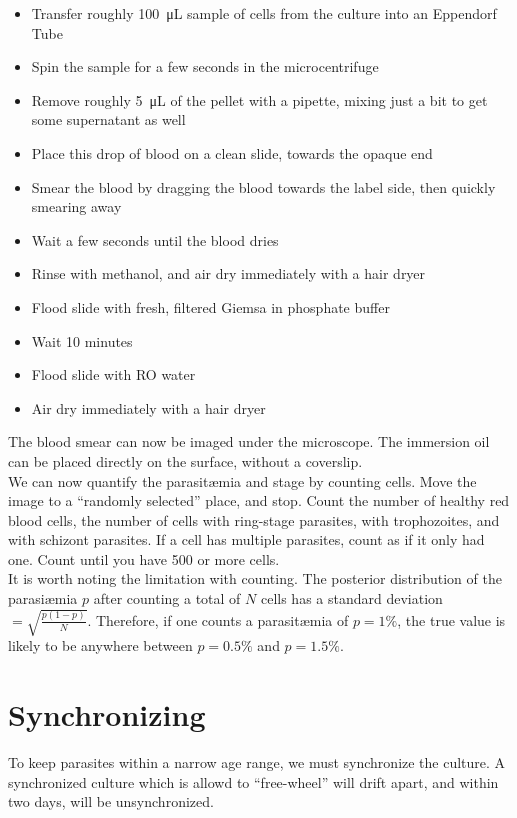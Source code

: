 \documentclass{article}
\begin{document}
\begin{itemize}
	\item Transfer roughly \SI{100}{\micro L} sample of cells from the culture into an Eppendorf Tube
	\item Spin the sample for a few seconds in the microcentrifuge
	\item Remove roughly \SI{5}{\micro L} of the pellet with a pipette, mixing just a bit to get some supernatant as well
	\item Place this drop of blood on a clean slide, towards the opaque end
	\item Smear the blood by dragging the blood towards the label side, then quickly smearing away 
	\item Wait a few seconds until the blood dries
	\item Rinse with methanol, and air dry immediately with a hair dryer
	\item Flood slide with fresh, filtered Giemsa in phosphate buffer
	\item Wait 10 minutes
	\item Flood slide with RO water
	\item Air dry immediately with a hair dryer
\end{itemize}

The blood smear can now be imaged under the microscope. The immersion oil can be placed directly on the surface, without a coverslip.\\

We can now quantify the parasit{\ae}mia and stage by counting cells. Move the image to a ``randomly selected'' place, and stop. Count the number of healthy red blood cells, the number of cells with ring-stage parasites, with trophozoites, and with schizont parasites. If a cell has multiple parasites, count as if it only had one. Count until you have 500 or more cells.\\

It is worth noting the limitation with counting. The posterior distribution of the parasi{\ae}mia $p$ after counting a total of $N$ cells has a standard deviation $ = \sqrt{\frac{p(1-p)}{N}}$. Therefore, if one counts a parasit{\ae}mia of $p = 1\%$, the true value is likely to be anywhere between $p = 0.5\%$ and $p = 1.5\%$.

\section{Synchronizing}

To keep parasites within a narrow age range, we must synchronize the culture. A synchronized culture which is allowd to ``free-wheel'' will drift apart, and within two days, will be unsynchronized.\\
\end{document}
